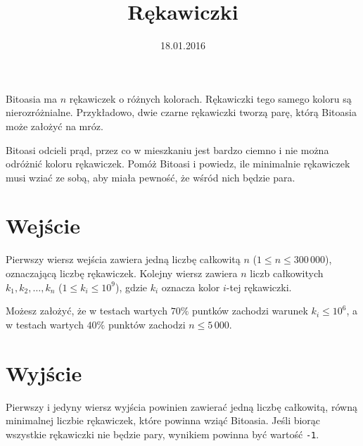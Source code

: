 \documentclass[zad,zawodnik,utf8]{sinol}
\title{Rękawiczki}
\author{} %
\date{18.01.2016}
\begin{document}
  \begin{tasktext}%
Bitoasia ma $n$ rękawiczek o różnych kolorach. Rękawiczki  tego samego koloru są nierozróżnialne. Przykładowo, dwie  czarne rękawiczki tworzą parę, którą Bitoasia może założyć  na mróz.

Bitoasi odcieli prąd, przez co w mieszkaniu jest bardzo  ciemno i nie można odróżnić koloru rękawiczek. 
Pomóż Bitoasi i powiedz, ile minimalnie rękawiczek musi wziać ze sobą, aby miała pewność, że wśród nich będzie para.

 \section{Wejście}
	
Pierwszy wiersz wejścia zawiera jedną liczbę całkowitą $n$  ($1 \leq n \leq 300\,000$), oznaczającą liczbę rękawiczek.  Kolejny wiersz zawiera $n$ liczb całkowitych $k_1, k_2, \ldots, k_n$ ($1 \leq k_i \leq 10^9$), gdzie $k_i$ oznacza  kolor $i$-tej rękawiczki.

Możesz założyć, że w testach wartych $70\%$ puntków  zachodzi warunek $k_i \leq 10^6$, a w testach wartych $40\%$ punktów zachodzi $n \leq 5\,000$.

  \section{Wyjście}
Pierwszy i jedyny wiersz wyjścia powinien zawierać jedną  liczbę całkowitą, równą minimalnej liczbie rękawiczek, które powinna wziąć Bitoasia. Jeśli biorąc wszystkie rękawiczki nie będzie pary, wynikiem powinna być wartość \texttt{-1}.

     \makecompactexample

  \end{tasktext}
\end{document}

